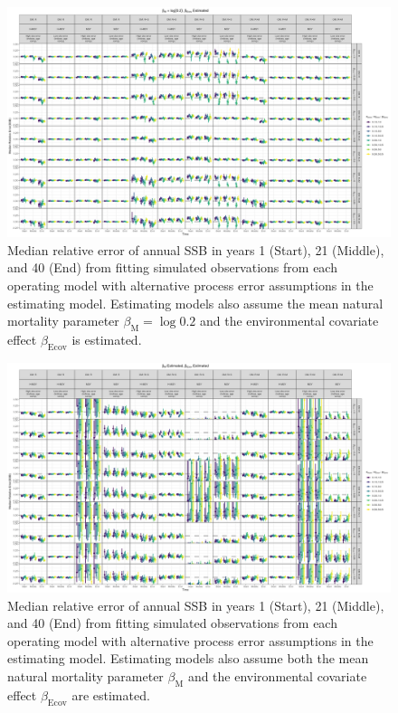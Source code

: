 \documentclass[
  12pt,
]{article}
\begin{document}
\begin{landscape}
\begin{figure}
\caption{Median relative error of annual SSB in years 1 (Start), 21 (Middle), and 40 (End) from fitting simulated observations from each operating model with alternative process error assumptions in the estimating model. Estimating models also assume the mean natural mortality parameter $\beta_\text{M} = \log 0.2$ and the environmental covariate effect $\beta_\text{Ecov}$ is estimated.}\label{SSB_bias_M_fixed_beta_estimated}
\begin{center}
\includegraphics[height = \textheight]{SSB_bias_all_PE_effect_M_fixed_beta_estimated.png}
\end{center}
\end{figure}
\end{landscape}

\begin{landscape}
\begin{figure}
\caption{Median relative error of annual SSB in years 1 (Start), 21 (Middle), and 40 (End) from fitting simulated observations from each operating model with alternative process error assumptions in the estimating model. Estimating models also assume both the mean natural mortality parameter $\beta_\text{M}$ and the environmental covariate effect $\beta_\text{Ecov}$ are estimated.}\label{SSB_bias_M_estimated_beta_estimated}
\begin{center}
\includegraphics[height = \textheight]{SSB_bias_all_PE_effect_M_estimated_beta_estimated.png}
\end{center}
\end{figure}
\end{landscape}
\end{document}
